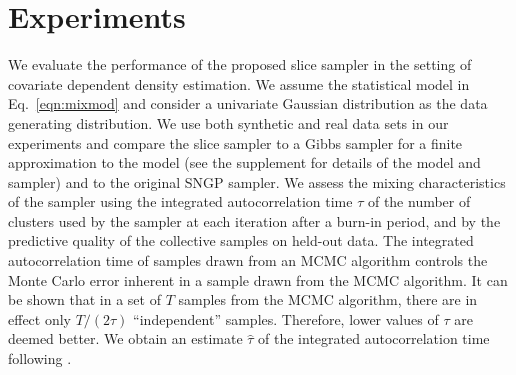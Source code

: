 \section{Experiments}

We evaluate the performance of the proposed slice sampler in the setting of
covariate dependent density estimation.  We assume 
the statistical
model in Eq.~\ref{eqn:mixmod} and consider a univariate Gaussian
distribution as the data generating distribution.  We use both synthetic and
real data sets in our experiments and compare the slice sampler to a Gibbs
sampler for a finite approximation to the model (see the supplement
for details of the model and sampler) and to the original SNGP sampler.
We assess the mixing
characteristics of the sampler using the integrated autocorrelation time $\tau$ of the
number of clusters used by the sampler at each iteration after a burn-in
period, and by the predictive quality of the collective samples on held-out
data.  The integrated autocorrelation time
of samples drawn from an MCMC algorithm
controls the Monte Carlo error inherent in a sample drawn from the MCMC
algorithm.  It can be shown that in a set of $T$ samples from the MCMC
algorithm, there are in effect only $T/(2\tau)$ ``independent'' samples.
Therefore, lower values of $\tau$ are deemed better. We obtain an estimate 
$\hat{\tau}$ of the integrated autocorrelation time following 
\cite{KalliGriffinWalker:2011}.


